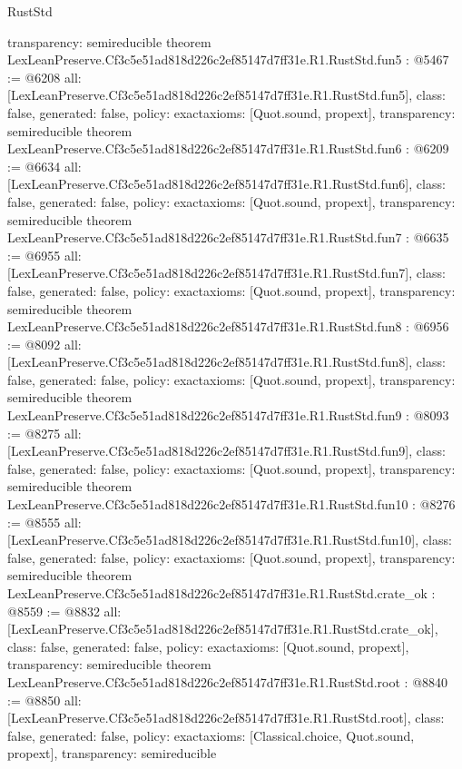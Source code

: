 \begin{lexlean}{RustStd}
\begin{coremodule}
{  transparency: semireducible
}
theorem LexLeanPreserve.Cf3c5e51ad818d226c2ef85147d7ff31e.R1.RustStd.fun5 : @5467 := @6208 {
  all: [LexLeanPreserve.Cf3c5e51ad818d226c2ef85147d7ff31e.R1.RustStd.fun5],
  class: false,
  generated: false,
  policy: exact{axioms: [Quot.sound, propext]},
  transparency: semireducible
}
theorem LexLeanPreserve.Cf3c5e51ad818d226c2ef85147d7ff31e.R1.RustStd.fun6 : @6209 := @6634 {
  all: [LexLeanPreserve.Cf3c5e51ad818d226c2ef85147d7ff31e.R1.RustStd.fun6],
  class: false,
  generated: false,
  policy: exact{axioms: [Quot.sound, propext]},
  transparency: semireducible
}
theorem LexLeanPreserve.Cf3c5e51ad818d226c2ef85147d7ff31e.R1.RustStd.fun7 : @6635 := @6955 {
  all: [LexLeanPreserve.Cf3c5e51ad818d226c2ef85147d7ff31e.R1.RustStd.fun7],
  class: false,
  generated: false,
  policy: exact{axioms: [Quot.sound, propext]},
  transparency: semireducible
}
theorem LexLeanPreserve.Cf3c5e51ad818d226c2ef85147d7ff31e.R1.RustStd.fun8 : @6956 := @8092 {
  all: [LexLeanPreserve.Cf3c5e51ad818d226c2ef85147d7ff31e.R1.RustStd.fun8],
  class: false,
  generated: false,
  policy: exact{axioms: [Quot.sound, propext]},
  transparency: semireducible
}
theorem LexLeanPreserve.Cf3c5e51ad818d226c2ef85147d7ff31e.R1.RustStd.fun9 : @8093 := @8275 {
  all: [LexLeanPreserve.Cf3c5e51ad818d226c2ef85147d7ff31e.R1.RustStd.fun9],
  class: false,
  generated: false,
  policy: exact{axioms: [Quot.sound, propext]},
  transparency: semireducible
}
theorem LexLeanPreserve.Cf3c5e51ad818d226c2ef85147d7ff31e.R1.RustStd.fun10 : @8276 := @8555 {
  all: [LexLeanPreserve.Cf3c5e51ad818d226c2ef85147d7ff31e.R1.RustStd.fun10],
  class: false,
  generated: false,
  policy: exact{axioms: [Quot.sound, propext]},
  transparency: semireducible
}
theorem LexLeanPreserve.Cf3c5e51ad818d226c2ef85147d7ff31e.R1.RustStd.crate_ok : @8559 := @8832 {
  all: [LexLeanPreserve.Cf3c5e51ad818d226c2ef85147d7ff31e.R1.RustStd.crate_ok],
  class: false,
  generated: false,
  policy: exact{axioms: [Quot.sound, propext]},
  transparency: semireducible
}
theorem LexLeanPreserve.Cf3c5e51ad818d226c2ef85147d7ff31e.R1.RustStd.root : @8840 := @8850 {
  all: [LexLeanPreserve.Cf3c5e51ad818d226c2ef85147d7ff31e.R1.RustStd.root],
  class: false,
  generated: false,
  policy: exact{axioms: [Classical.choice, Quot.sound, propext]},
  transparency: semireducible
}


\end{coremodule}
\end{lexlean}
